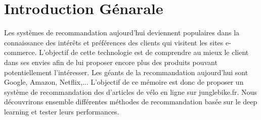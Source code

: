 \chapter*{Introduction Génarale}

Les systèmes de recommandation aujourd’hui deviennent populaires dans la connaissance des intérêts et préférences des clients qui visitent les sites e-commerce. L’objectif de cette technologie est de comprendre au mieux le client dans ses envies afin de lui proposer encore plus des produits pouvant potentiellement l’intéresser. Les géants de la recommandation aujourd’hui sont Google, Amazon, Netflix,...
\newline
L'objectif de ce mémoire est donc de proposer un système de recommandation des d'articles de vélo en ligne sur junglebike.fr. Nous découvrirons ensemble différentes méthodes de recommandation basée sur le deep learning et tester leurs performances.
